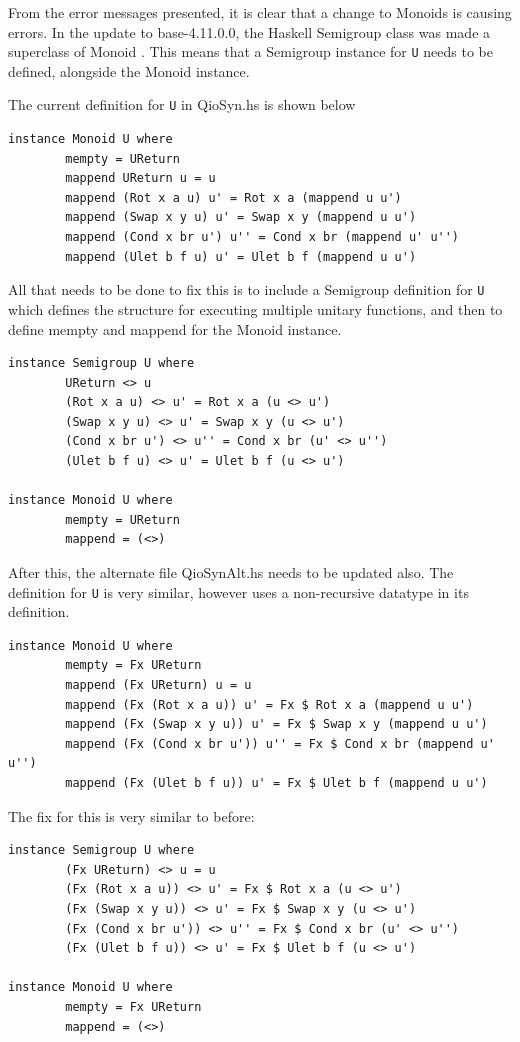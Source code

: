 \documentclass[a4paper,10pt, titlepage, twoside]{article}
\begin{document}
From the error messages presented, it is clear that a change to Monoids is causing errors. In the update to base-4.11.0.0, the Haskell Semigroup class was made a superclass of Monoid \cite{base411}. This means that a Semigroup instance for \texttt{U} needs to be defined, alongside the Monoid instance.\par
The current definition for \texttt{U} in QioSyn.hs is shown below
\begin{verbatim}
instance Monoid U where
        mempty = UReturn
        mappend UReturn u = u
        mappend (Rot x a u) u' = Rot x a (mappend u u')
        mappend (Swap x y u) u' = Swap x y (mappend u u')
        mappend (Cond x br u') u'' = Cond x br (mappend u' u'')
        mappend (Ulet b f u) u' = Ulet b f (mappend u u') 
\end{verbatim}
All that needs to be done to fix this is to include a Semigroup definition for \texttt{U} which defines the structure for executing multiple unitary functions, and then to define mempty and mappend for the Monoid instance.
\begin{verbatim}
instance Semigroup U where
        UReturn <> u
        (Rot x a u) <> u' = Rot x a (u <> u')
        (Swap x y u) <> u' = Swap x y (u <> u')
        (Cond x br u') <> u'' = Cond x br (u' <> u'')
        (Ulet b f u) <> u' = Ulet b f (u <> u')
        
instance Monoid U where
        mempty = UReturn
        mappend = (<>)
\end{verbatim}\par
After this, the alternate file QioSynAlt.hs needs to be updated also. The definition for \texttt{U} is very similar, however uses a non-recursive datatype in its definition.
\begin{verbatim}
instance Monoid U where
        mempty = Fx UReturn
        mappend (Fx UReturn) u = u
        mappend (Fx (Rot x a u)) u' = Fx $ Rot x a (mappend u u')
        mappend (Fx (Swap x y u)) u' = Fx $ Swap x y (mappend u u')
        mappend (Fx (Cond x br u')) u'' = Fx $ Cond x br (mappend u' u'')
        mappend (Fx (Ulet b f u)) u' = Fx $ Ulet b f (mappend u u') 
\end{verbatim}
The fix for this is very similar to before:
\begin{verbatim}
instance Semigroup U where
        (Fx UReturn) <> u = u
        (Fx (Rot x a u)) <> u' = Fx $ Rot x a (u <> u')
        (Fx (Swap x y u)) <> u' = Fx $ Swap x y (u <> u')
        (Fx (Cond x br u')) <> u'' = Fx $ Cond x br (u' <> u'')
        (Fx (Ulet b f u)) <> u' = Fx $ Ulet b f (u <> u') 
        
instance Monoid U where
        mempty = Fx UReturn
        mappend = (<>)
\end{verbatim}\par
\end{document}
